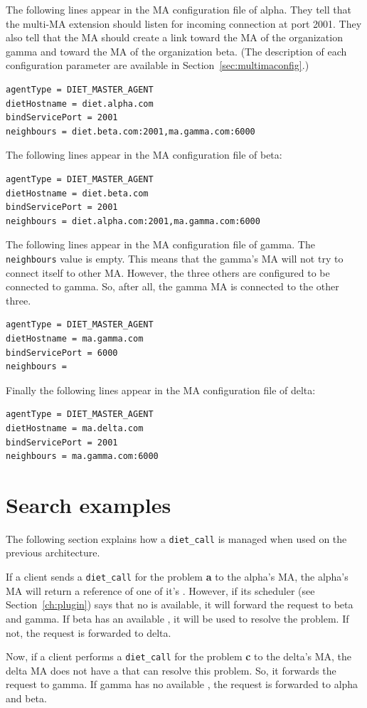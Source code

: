 The following lines appear in the MA configuration file of alpha. They
tell that the multi-MA extension should listen for incoming connection
at port 2001. They also tell that the MA should create a link toward
the MA of the organization gamma and toward the MA of the organization
beta. (The description of each configuration parameter are available
in Section~\ref{sec:multimaconfig}.)

\begin{verbatim}
agentType = DIET_MASTER_AGENT
dietHostname = diet.alpha.com
bindServicePort = 2001
neighbours = diet.beta.com:2001,ma.gamma.com:6000
\end{verbatim}

The following lines appear in the MA configuration file of beta:

\begin{verbatim}
agentType = DIET_MASTER_AGENT
dietHostname = diet.beta.com
bindServicePort = 2001
neighbours = diet.alpha.com:2001,ma.gamma.com:6000
\end{verbatim}

The following lines appear in the MA configuration file of gamma. The
\texttt{neighbours} value is empty. This means that the gamma's MA
will not try to connect itself to other MA. However, the three others
are configured to be connected to gamma. So, after all, the gamma MA
is connected to the other three.

\begin{verbatim}
agentType = DIET_MASTER_AGENT
dietHostname = ma.gamma.com
bindServicePort = 6000
neighbours = 
\end{verbatim}

Finally the following lines appear in the MA configuration file of delta:

\begin{verbatim}
agentType = DIET_MASTER_AGENT
dietHostname = ma.delta.com
bindServicePort = 2001
neighbours = ma.gamma.com:6000
\end{verbatim}

\section{Search examples}

The following section explains how a \texttt{diet\_call} is managed
when used on the previous architecture.

If a client sends a \texttt{diet\_call} for the problem \textbf{a} to
the alpha's MA, the alpha's MA will return a reference of one of it's
\sed. However, if its scheduler (see Section~\ref{ch:plugin}) says
that no \sed is available, it will forward the request to beta and
gamma. If beta has an available \sed, it will be used to resolve the
problem. If not, the request is forwarded to delta.

Now, if a client performs a \texttt{diet\_call} for the problem
\textbf{c} to the delta's MA, the delta MA does not have a \sed that
can resolve this problem. So, it forwards the request to gamma. If
gamma has no available \sed, the request is forwarded to alpha and
beta.
